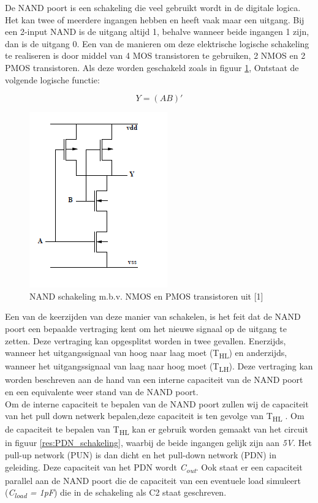\documentclass{article}
\begin{document}
\newcommand{\tss}{\textsubscript}

De NAND poort is een schakeling die veel gebruikt wordt in de digitale logica. Het kan twee of meerdere ingangen hebben en heeft vaak maar een uitgang. Bij een 2-input NAND is de uitgang altijd 1, behalve wanneer beide ingangen 1 zijn, dan is de uitgang 0. Een van de manieren om deze elektrische logische schakeling te realiseren is door middel van 4 MOS transistoren te gebruiken, 2 NMOS en 2 PMOS transistoren. Als deze worden geschakeld zoals in figuur \ref{res:NAND_schakeling}, Ontstaat de volgende logische functie: 

\begin{equation}
Y = (AB)'
\end{equation}

 \begin{figure} [h!]
 \begin{center}
 \includegraphics [scale = 1] {figures/NAND}
 \caption{NAND schakeling m.b.v. NMOS en PMOS transistoren uit [1]}
 \label{res:NAND_schakeling}
 \end{center}
 \end{figure}

Een van de keerzijden van deze manier van schakelen, is het feit dat de NAND poort een bepaalde vertraging kent om het nieuwe signaal op de uitgang te zetten. Deze vertraging kan opgesplitst worden in twee gevallen. Enerzijds, wanneer het uitgangssignaal van hoog naar laag moet (T\tss{HL}) en anderzijds, wanneer het uitgangssignaal van laag naar hoog moet (T\tss{LH}). Deze vertraging kan worden beschreven aan de hand van een interne capaciteit van de NAND poort en een equivalente weer stand van de NAND poort.\\

Om de interne capaciteit te bepalen van de NAND poort zullen wij de capaciteit van het pull down netwerk bepalen,deze capaciteit is ten gevolge van T\tss{HL} . Om de capaciteit te bepalen van T\tss{HL} kan er gebruik worden gemaakt van het  circuit in figuur \ref{res:PDN_schakeling}, waarbij de beide ingangen gelijk zijn aan \emph{5V}. Het pull-up network (PUN) is dan dicht en het pull-down network (PDN) in geleiding. Deze capaciteit van het PDN wordt \emph{C\tss{out}}. Ook staat er een capaciteit parallel aan de NAND poort die de capaciteit van een eventuele load simuleert (\emph{C\tss{load} = 1pF}) die in de schakeling als C2 staat geschreven.
\end{document}
